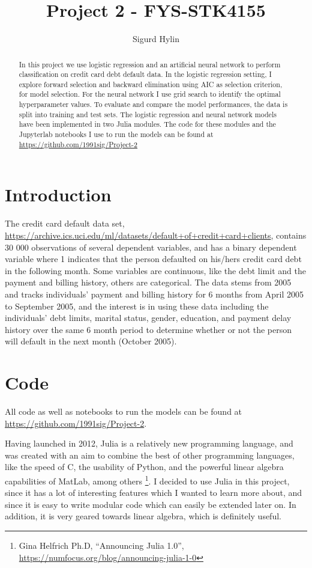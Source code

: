 \documentclass[]{article}
\title{Project 2 - FYS-STK4155}
\author{Sigurd Hylin}
\date{}
\let\rmarkdownfootnote\footnote%
\def\footnote{\protect\rmarkdownfootnote}
\begin{document}
\maketitle
\begin{abstract}
In this project we use logistic regression and an artificial neural
network to perform classification on credit card debt default data. In
the logistic regression setting, I explore forward selection and
backward elimination using AIC as selection criterion, for model
selection. For the neural network I use grid search to identify the
optimal hyperparameter values. To evaluate and compare the model
performances, the data is split into training and test sets. The
logistic regression and neural network models have been implemented in
two Julia modules. The code for these modules and the Jupyterlab
notebooks I use to run the models can be found at
\url{https://github.com/1991sig/Project-2}
\end{abstract}

{
\setcounter{tocdepth}{2}
\tableofcontents
}
\section{Introduction}\label{introduction}

The credit card default data set,
\url{https://archive.ics.uci.edu/ml/datasets/default+of+credit+card+clients},
contains 30 000 observations of several dependent variables, and has a
binary dependent variable where 1 indicates that the person defaulted on
his/hers credit card debt in the following month. Some variables are
continuous, like the debt limit and the payment and billing history,
others are categorical. The data stems from 2005 and tracks individuals'
payment and billing history for 6 months from April 2005 to September
2005, and the interest is in using these data including the individuals'
debt limits, marital status, gender, education, and payment delay
history over the same 6 month period to determine whether or not the
person will default in the next month (October 2005).

\section{Code}\label{code}

All code as well as notebooks to run the models can be found at
\url{https://github.com/1991sig/Project-2}.

Having launched in 2012, Julia is a relatively new programming language,
and was created with an aim to combine the best of other programming
languages, like the speed of C, the usability of Python, and the
powerful linear algebra capabilities of MatLab, among others \footnote{Gina
  Helfrich Ph.D, ``Announcing Julia 1.0'',
  \url{https://numfocus.org/blog/announcing-julia-1-0}}. I decided to
use Julia in this project, since it has a lot of interesting features
which I wanted to learn more about, and since it is easy to write
modular code which can easily be extended later on. In addition, it is
very geared towards linear algebra, which is definitely useful.
\end{document}
